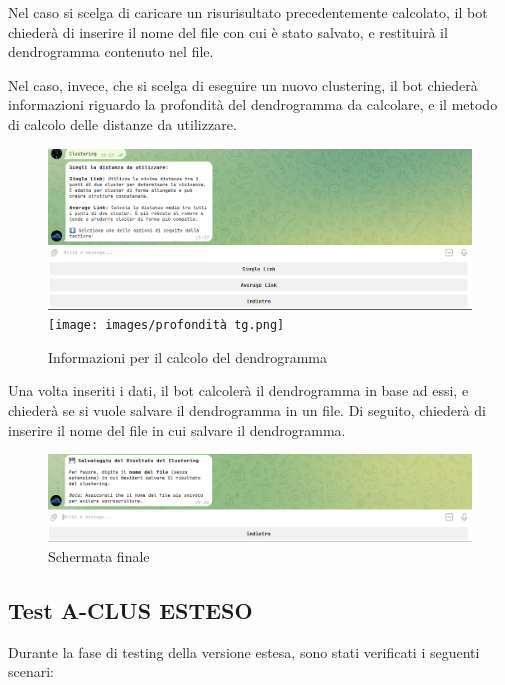 Nel caso si scelga di caricare un risurisultato  precedentemente calcolato, il bot chiederà di inserire il nome del file con cui è stato salvato, e restituirà il dendrogramma contenuto nel file. 

Nel caso, invece, che si scelga di eseguire un nuovo clustering, il bot chiederà informazioni  riguardo la profondità del dendrogramma da calcolare, e il metodo di calcolo delle distanze da utilizzare.

\begin{figure}
    \centering
    \includegraphics[width=.5\textwidth]{images/distanza da calcaolare tg.png}
    \texttt{[image: images/profondità tg.png]}
    \caption{Informazioni per il calcolo del dendrogramma}

\end{figure}

Una volta inseriti i dati, il bot calcolerà il dendrogramma in base ad essi, e chiederà se si vuole salvare il dendrogramma in un file. Di seguito, chiederà di inserire il nome del file in cui salvare il dendrogramma.


\begin{figure}
    \centering
    \includegraphics[width=.5\textwidth]{images/finale tg.png}
    \caption{Schermata finale}
\end{figure}


\subsection{Test A-CLUS ESTESO}

Durante la fase di testing della versione estesa, sono stati verificati i seguenti scenari:

